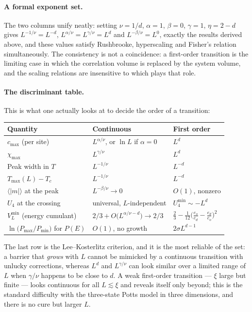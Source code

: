 \documentclass[10pt,a4paper]{article}
\theoremstyle{remark}
\begin{document}
\paragraph{A formal exponent set.} The two columns unify neatly: setting
$\nu=1/d$, $\alpha=1$, $\beta=0$, $\gamma=1$, $\eta=2-d$ gives
$L^{-1/\nu}=L^{-d}$, $L^{\alpha/\nu}=L^{\gamma/\nu}=L^{d}$ and
$L^{-\beta/\nu}=L^{0}$, exactly the results derived above, and these values
satisfy Rushbrooke, hyperscaling and Fisher's relation simultaneously. The
consistency is not a coincidence: a first-order transition is the limiting case
in which the correlation volume is replaced by the system volume, and the scaling
relations are insensitive to which plays that role.

\paragraph{The discriminant table.} This is what one actually looks at to decide
the order of a transition:
\begin{center}
\renewcommand{\arraystretch}{1.2}
\begin{tabular}{lll}
\toprule
Quantity & Continuous & First order\\
\midrule
$c_{\max}$ (per site) & $L^{\alpha/\nu}$, or $\ln L$ if $\alpha=0$ & $L^{d}$\\
$\chi_{\max}$ & $L^{\gamma/\nu}$ & $L^{d}$\\
Peak width in $T$ & $L^{-1/\nu}$ & $L^{-d}$\\
$T_{\max}(L)-T_c$ & $L^{-1/\nu}$ & $L^{-d}$\\
$\langle|m|\rangle$ at the peak & $L^{-\beta/\nu}\to0$ & $O(1)$, nonzero\\
$U_4$ at the crossing & universal, $L$-independent & $U_4^{\min}\sim-L^{d}$\\
$V_L^{\min}$ (energy cumulant) & $2/3+O\big(L^{\alpha/\nu-d}\big)\to2/3$ &
  $\tfrac{2}{3}-\tfrac{1}{12}\big(\tfrac{e_o}{e_d}-\tfrac{e_d}{e_o}\big)^{2}$\\
$\ln\big(P_{\max}/P_{\min}\big)$ for $P(E)$ & $O(1)$, no growth & $2\sigma L^{d-1}$\\
\bottomrule
\end{tabular}
\end{center}
The last row is the Lee--Kosterlitz criterion, and it is the most reliable of the
set: a barrier that \emph{grows} with $L$ cannot be mimicked by a continuous
transition with unlucky corrections, whereas $L^{d}$ and $L^{\gamma/\nu}$ can look
similar over a limited range of $L$ when $\gamma/\nu$ happens to be close to $d$.
A weak first-order transition --- $\xi$ large but finite --- looks continuous for
all $L\lesssim\xi$ and reveals itself only beyond; this is the standard
difficulty with the three-state Potts model in three dimensions, and there is no
cure but larger $L$.
\end{document}
